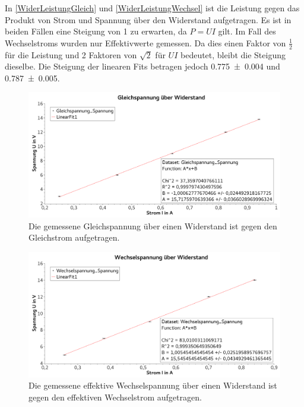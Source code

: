 \documentclass[
	a4paper,
	12pt,
	pagesize,
	ngerman
]{scrartcl}
\begin{document}
	In \cref{WiderLeistungGleich} und \cref{WiderLeistungWechsel} ist die Leistung gegen das Produkt von Strom und Spannung über den Widerstand aufgetragen. 
	Es ist in beiden Fällen eine Steigung von 1 zu erwarten, da $P = UI$ gilt. 
	Im Fall des Wechselstroms wurden nur Effektivwerte gemessen. 
	Da dies einen Faktor von $\frac{1}{2}$ für die Leistung und 2 Faktoren von $\sqrt{2}$ für $UI$ bedeutet, bleibt die Steigung dieselbe.
	Die Steigung der linearen Fits betragen jedoch \SI{0,775 \pm 0,004}{} und \SI{0,787 \pm 0,005}{}.
	\begin{figure}[tb]
		\includegraphics[width=1\textwidth]{WiderSpannungGleich}
		\centering
		\caption{Die gemessene Gleichspannung über einen Widerstand ist gegen den Gleichstrom aufgetragen.}
		\label{WiderSpannungGleich}
		\centering
	\end{figure}
	\begin{figure}[tb]
		\includegraphics[width=1\textwidth]{WiderSpannungWechsel}
		\centering
		\caption{Die gemessene effektive Wechselspannung über einen Widerstand ist gegen den effektiven Wechselstrom aufgetragen.}
		\label{WiderSpannungWechsel}
		\centering
	\end{figure}
\end{document}
